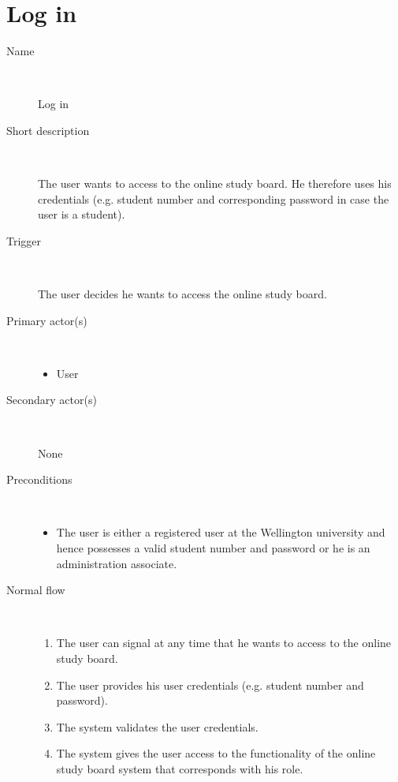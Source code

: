 \section{Log in}

\begin{description}
	\item[Name] \
		\par Log in
	\item[Short description] \ 
			\par The user wants to access to the online study board. He therefore uses
			his credentials (e.g. student number and corresponding password in case
			the user is a student). 
	\item[Trigger] \ 
			\par The user decides he wants to access the online study board.
	\item[Primary actor(s)] \ 
		\begin{itemize}
		  \item User
		\end{itemize}
	\item[Secondary actor(s)] \ 
		\par None
	\item[Preconditions] \ 
	\begin{itemize}
		\item The user is either a registered user at the Wellington university and
		hence possesses a valid student number and password or he is an administration
		associate.
	\end{itemize}
	\item[Normal flow] \ 
	\begin{enumerate}
	  	\item The user can signal at any time that he wants to access to the online
	  	study board.
	  	\item The user provides his user credentials (e.g. student number and
	  	password).
	  	\item The system validates the user credentials.
	  	\item The system gives the user access to the functionality of the online
	  	study board system that corresponds with his role.


\end{enumerate}
\end{description}
